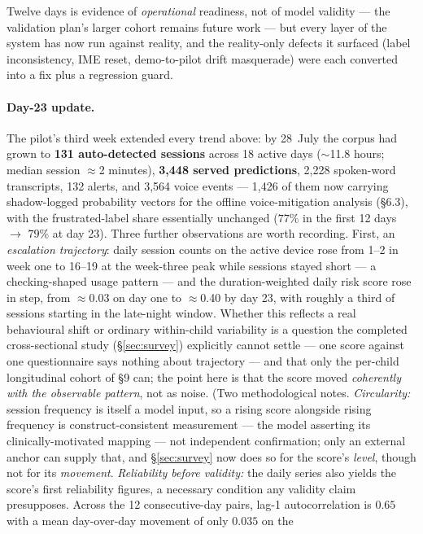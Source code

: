 \documentclass[11pt,a4paper]{article}
\begin{document}
Twelve days is evidence of \emph{operational} readiness, not of model validity ---
the validation plan's larger cohort remains future work --- but every layer of the
system has now run against reality, and the reality-only defects it surfaced (label
inconsistency, IME reset, demo-to-pilot drift masquerade) were each converted into a
fix plus a regression guard.

\paragraph{Day-23 update.} The pilot's third week extended every trend above: by
28~July the corpus had grown to \textbf{131 auto-detected sessions} across 18 active
days ($\sim$11.8 hours; median session $\approx$2 minutes), \textbf{3{,}448 served
predictions}, 2{,}228 spoken-word transcripts, 132 alerts, and 3{,}564 voice events
--- 1{,}426 of them now carrying shadow-logged probability vectors for the offline
voice-mitigation analysis (\S6.3), with the frustrated-label share essentially
unchanged ($77\%$ in the first 12 days $\rightarrow$ $79\%$ at day 23).
Three further observations are worth recording. First, an \emph{escalation
trajectory}: daily session counts on the active device rose from 1--2 in week one to
16--19 at the week-three peak while sessions stayed short --- a checking-shaped usage
pattern --- and the duration-weighted daily risk score rose in step, from
$\approx$0.03 on day one to $\approx$0.40 by day 23, with roughly a third of sessions
starting in the late-night window. Whether this reflects a real behavioural shift or
ordinary within-child variability is a question the completed cross-sectional
study (\S\ref{sec:survey}) explicitly cannot settle --- one score against one
questionnaire says nothing about trajectory --- and that only the per-child
longitudinal cohort of \S9 can; the point here is that the score moved
\emph{coherently with the
observable pattern}, not as noise. (Two methodological notes. \emph{Circularity:}
session frequency is itself a model input, so a rising score alongside rising
frequency is construct-consistent measurement --- the model asserting its
clinically-motivated mapping --- not independent confirmation; only an external
anchor can supply that, and \S\ref{sec:survey} now does so for the score's
\emph{level}, though not for its \emph{movement}. \emph{Reliability before validity:} the daily
series also yields the score's first reliability figures, a necessary condition any
validity claim presupposes. Across the 12 consecutive-day pairs, lag-1
autocorrelation is $0.65$ with a mean day-over-day movement of only $0.035$ on the
\end{document}
